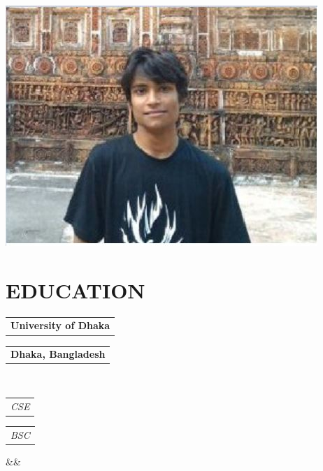 \documentclass[11pt,a4paper,roman]{moderncv}
\makeatletter
\newcommand*{\customcventry}[7][.25em]{
  \begin{tabular}{@{}l} 
    {\bfseries #4}
  \end{tabular}
  \hfill%
  \begin{tabular}{l@{}}
     {\bfseries #5}
  \end{tabular} \\
  \begin{tabular}{@{}l} 
    {\itshape #3}
  \end{tabular}
  \hfill%
  \begin{tabular}{l@{}}
     {\itshape #2}
  \end{tabular}
  \ifx&#7&%
  \else{\\%
    \begin{minipage}{\maincolumnwidth}%
      \small#7%
    \end{minipage}}\fi%
  \par\addvspace{#1}}
\makeatother
\begin{document}

\makecvtitle
\vspace{-.2in}
\begin{center}
	\includegraphics[scale=.2]{pp1}
\end{center}
\vspace*{-.2in}

\section{EDUCATION}
{\customcventry{BSC}{CSE}{University of Dhaka}{Dhaka, Bangladesh}{}{}}

\end{document}
